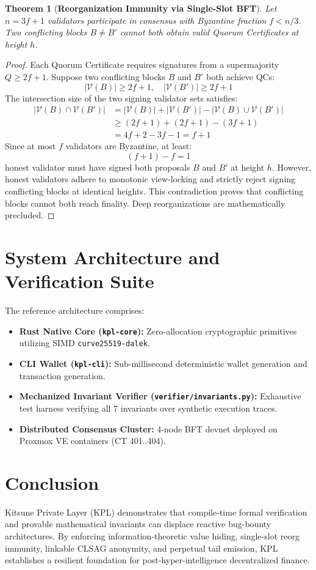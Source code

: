 \documentclass[11pt,a4paper]{article}
\newtheorem{theorem}{Theorem}
\begin{document}
\begin{theorem}[\textbf{Reorganization Immunity via Single-Slot BFT}]
Let $n = 3f + 1$ validators participate in consensus with Byzantine fraction $f < n/3$. Two conflicting blocks $B \ne B'$ cannot both obtain valid Quorum Certificates at height $h$.
\end{theorem}

\begin{proof}
Each Quorum Certificate requires signatures from a supermajority $Q \ge 2f + 1$. Suppose two conflicting blocks $B$ and $B'$ both achieve QCs:
\[
|\mathcal{V}(B)| \ge 2f + 1, \quad |\mathcal{V}(B')| \ge 2f + 1
\]
The intersection size of the two signing validator sets satisfies:
\begin{align*}
|\mathcal{V}(B) \cap \mathcal{V}(B')| &= |\mathcal{V}(B)| + |\mathcal{V}(B')| - |\mathcal{V}(B) \cup \mathcal{V}(B')| \\
&\ge (2f + 1) + (2f + 1) - (3f + 1) \\
&= 4f + 2 - 3f - 1 = f + 1
\end{align*}
Since at most $f$ validators are Byzantine, at least:
\[
(f + 1) - f = 1
\]
honest validator must have signed both proposals $B$ and $B'$ at height $h$. However, honest validators adhere to monotonic view-locking and strictly reject signing conflicting blocks at identical heights. This contradiction proves that conflicting blocks cannot both reach finality. Deep reorganizations are mathematically precluded.
\end{proof}

\section{System Architecture and Verification Suite}

The reference architecture comprises:
\begin{itemize}
    \item \textbf{Rust Native Core (\texttt{kpl-core}):} Zero-allocation cryptographic primitives utilizing SIMD \texttt{curve25519-dalek}.
    \item \textbf{CLI Wallet (\texttt{kpl-cli}):} Sub-millisecond deterministic wallet generation and transaction generation.
    \item \textbf{Mechanized Invariant Verifier (\texttt{verifier/invariants.py}):} Exhaustive test harness verifying all 7 invariants over synthetic execution traces.
    \item \textbf{Distributed Consensus Cluster:} 4-node BFT devnet deployed on Proxmox VE containers (CT 401..404).
\end{itemize}

\section{Conclusion}

Kitsune Private Layer (KPL) demonstrates that compile-time formal verification and provable mathematical invariants can displace reactive bug-bounty architectures. By enforcing information-theoretic value hiding, single-slot reorg immunity, linkable CLSAG anonymity, and perpetual tail emission, KPL establishes a resilient foundation for post-hyper-intelligence decentralized finance.
\end{document}
